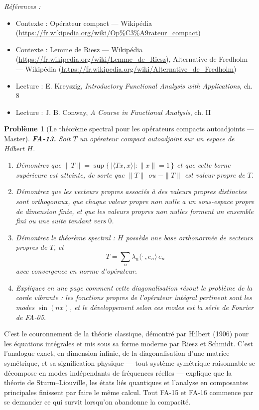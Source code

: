 \documentclass[11pt]{article}
\newtheorem{problem}{Problème}
\newenvironment{refs}{\par\small\noindent\emph{Références :}\begin{itemize}\setlength\itemsep{0pt}}{\end{itemize}\normalsize}
\begin{document}
\begin{refs}
\item Contexte : Opérateur compact --- Wikipédia (\url{https://fr.wikipedia.org/wiki/Op%C3%A9rateur_compact})
\item Contexte : Lemme de Riesz --- Wikipédia (\url{https://fr.wikipedia.org/wiki/Lemme_de_Riesz}), Alternative de Fredholm --- Wikipédia (\url{https://fr.wikipedia.org/wiki/Alternative_de_Fredholm})
\item Lecture : E. Kreyszig, \textit{Introductory Functional Analysis with Applications}, ch. 8
\item Lecture : J. B. Conway, \textit{A Course in Functional Analysis}, ch. II
\end{refs}

\bigskip

\begin{problem}[{Le théorème spectral pour les opérateurs compacts autoadjoints --- Master}]
\textbf{FA-13.} Soit $ T $ un opérateur compact autoadjoint sur un espace de Hilbert
$ H $.
\begin{enumerate}
\item[(a)] Démontrez que $ \|T\| = \sup\{\, |\langle Tx, x\rangle| : \|x\| = 1 \,\} $ et que cette borne
supérieure est atteinte, de sorte que $ \|T\| $ ou $ -\|T\| $ est valeur propre de
$ T $.
\item[(b)] Démontrez que les vecteurs propres associés à des valeurs propres distinctes sont orthogonaux,
que chaque valeur propre non nulle a un sous-espace propre de dimension finie, et que les valeurs
propres non nulles forment un ensemble fini ou une suite tendant vers $ 0 $.
\item[(c)] Démontrez le théorème spectral : $ H $ possède une base orthonormée de vecteurs propres de
$ T $, et
\[ T = \sum_n \lambda_n \langle \cdot\,, e_n\rangle\, e_n \]
avec convergence en norme d'opérateur.
\item[(d)] Expliquez en une page comment cette diagonalisation résout le problème de la corde vibrante : les
fonctions propres de l'opérateur intégral pertinent sont les modes $ \sin(nx) $, et le développement
selon ces modes est la série de Fourier de FA-05.
\end{enumerate}

\end{problem}

\noindent C'est le couronnement de la théorie classique, démontré par Hilbert (1906) pour les
équations intégrales et mis sous sa forme moderne par Riesz et Schmidt. C'est l'analogue exact, en
dimension infinie, de la diagonalisation d'une matrice symétrique, et sa signification physique --- tout
système symétrique \og{} raisonnable \fg{} se décompose en modes indépendants de fréquences réelles --- explique
que la théorie de Sturm--Liouville, les états liés quantiques et l'analyse en composantes principales
finissent par faire le même calcul. Tout FA-15 et FA-16 commence par se demander ce qui survit lorsqu'on
abandonne la compacité.
\end{document}
